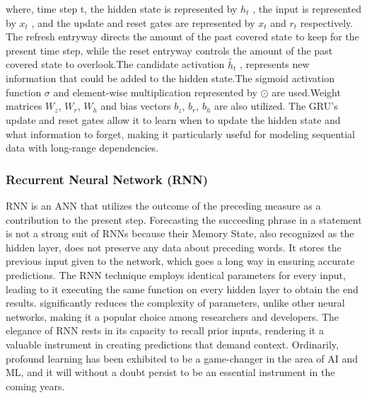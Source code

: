 \documentclass[a4paper, fleqn]{cas-sc}
\theoremstyle{definition}
\theoremstyle{remark}
\begin{document}

where,  time step t,  the hidden state is represented by $ h_t $ ,  the input is represented by $ x_t $ ,  and the update and reset gates are
represented by $ x_t $ and $ r_t$ respectively. The refresh entryway directs the amount of the past covered state to keep for the present time step,  while the reset entryway controls the amount of the past covered state to overlook.The candidate activation $\tilde{h_t}$ , represents new information that could be added to the hidden state.The sigmoid activation function $ \sigma $ and element-wise multiplication represented by $\odot$ are used.Weight matrices $ W_z $,  $ W_r $,  $ W_h $ and bias vectors $ b_z $,  $ b_r $,  $ b_h $ are also utilized. The GRU's update and reset gates allow it to learn when to update the hidden state and what information to forget,  making it particularly useful for modeling sequential data with long-range dependencies.
\subsubsection{Recurrent Neural Network (RNN)}
RNN is an ANN that utilizes the outcome of the preceding measure as a contribution to the present step. Forecasting the succeeding phrase in a statement is not a strong suit of RNNs because their Memory State,  also recognized as the hidden layer,  does not preserve any data about preceding words. It stores the previous input given to the network,  which goes a long way in ensuring accurate predictions. The RNN technique employs identical parameters for every input,  leading to it executing the same function on every hidden layer to obtain the end results. significantly reduces the complexity of parameters,  unlike other neural networks,  making it a popular choice among researchers and developers. The elegance of RNN rests in its capacity to recall prior inputs,  rendering it a valuable instrument in creating predictions that demand context. Ordinarily,  profound learning has been exhibited to be a game-changer in the area of AI and ML,  and it will without a doubt persist to be an essential instrument in the coming years.
\end{document}
